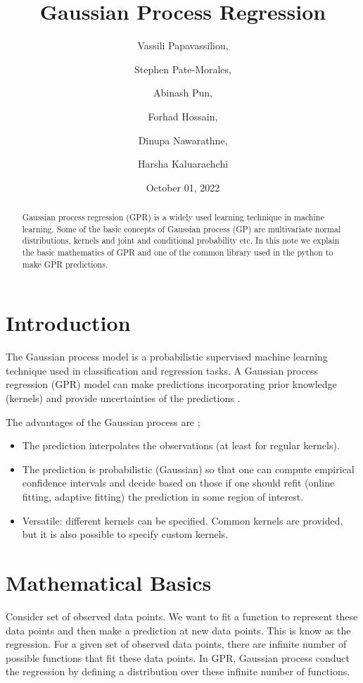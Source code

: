 \documentclass{article}
\title{Gaussian Process Regression}
\author{Vassili Papavassiliou, \and Stephen Pate-Morales, \and Abinash Pun, \and Forhad Hossain, \and Dinupa Nawarathne, \and Harsha Kaluarachchi}
\date{October 01, 2022}
\begin{document}
\maketitle

\begin{abstract}
Gaussian process regression (GPR) is a widely used learning technique in machine learning. Some of the basic concepts of Gaussian process (GP) are multivariate normal distributions, kernels and joint and conditional probability etc. In this note we explain the basic mathematics of GPR and one of the common library used in the python to make GPR predictions.
\end{abstract}

\section{Introduction}

The Gaussian process model is a probabilistic supervised machine learning technique used in classification and regression tasks. A Gaussian process regression (GPR) model can make predictions incorporating prior knowledge (kernels) and provide uncertainties of the predictions \cite{10.7551/mitpress/3206.001.0001}.

The advantages of the Gaussian process are \cite{scikit-learn};

\begin{itemize}
\item The prediction interpolates the observations (at least for regular kernels).
\item The prediction is probabilistic (Gaussian) so that one can compute empirical confidence intervals and decide based on those if one should refit (online fitting, adaptive fitting) the prediction in some region of interest.
\item Versatile: different kernels can be specified. Common kernels are provided, but it is also possible to specify custom kernels.
\end{itemize}

\section{Mathematical Basics}

Consider set of observed data points. We want to fit a function to represent these data points and then make a prediction at new data points. This is know as the regression. For a given set of observed data points, there are infinite number of possible functions that fit these data points. In GPR, Gaussian process conduct the regression by defining a distribution over these infinite number of functions.
\end{document}
